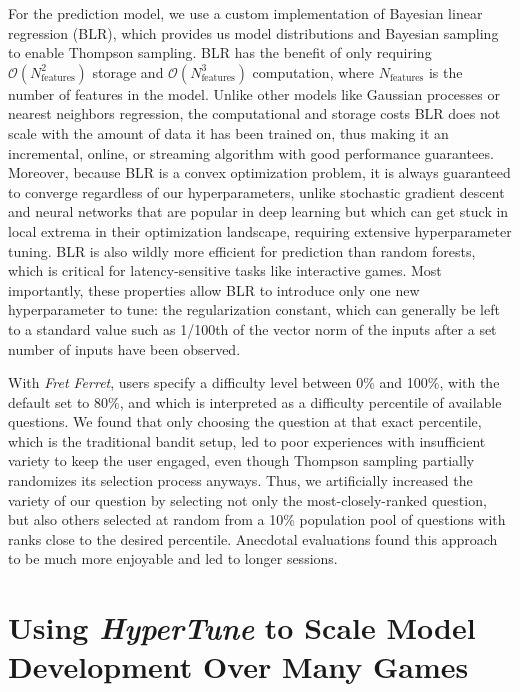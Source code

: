 \documentclass[manuscript, nonacm]{acmart_no_footer}
\begin{document}
For the prediction model, we use a custom implementation of Bayesian linear regression\cite{BLR, Mason_Gaussian_processes_and_2021} (BLR), which provides us model distributions and Bayesian sampling to enable Thompson sampling. BLR has the benefit of only requiring $\mathcal{O}\left(N_\text{features}^2\right)$ storage and $\mathcal{O}\left(N_\text{features}^3\right)$ computation, where $N_\text{features}$ is the number of features in the model. Unlike other models like Gaussian processes or nearest neighbors regression, the computational and storage costs BLR does not scale with the amount of data it has been trained on, thus making it an incremental, online, or streaming algorithm with good performance guarantees. Moreover, because BLR is a convex optimization problem, it is always guaranteed to converge regardless of our hyperparameters, unlike stochastic gradient descent and neural networks that are popular in deep learning but which can get stuck in local extrema in their optimization landscape, requiring extensive hyperparameter tuning. BLR is also wildly more efficient for prediction than random forests, which is critical for latency-sensitive tasks like interactive games. Most importantly, these properties allow BLR to introduce only one new hyperparameter to tune: the regularization constant, which can generally be left to a standard value such as 1/100th of the vector norm of the inputs after a set number of inputs have been observed.

With \textit{Fret Ferret}, users specify a difficulty level between 0\% and 100\%, with the default set to 80\%, and which is interpreted as a difficulty percentile of available questions. We found that only choosing the question at that exact percentile, which is the traditional bandit setup, led to poor experiences with insufficient variety to keep the user engaged, even though Thompson sampling partially randomizes its selection process anyways. Thus, we artificially increased the variety of our question by selecting not only the most-closely-ranked question, but also others selected at random from a 10\% population pool of questions with ranks close to the desired percentile. Anecdotal evaluations found this approach to be much more enjoyable and led to longer sessions. 

\section{Using \textit{HyperTune} to Scale Model Development Over Many Games}
\end{document}
